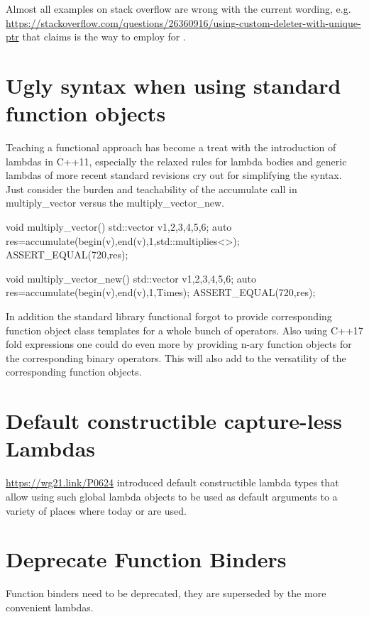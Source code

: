 \documentclass[ebook,11pt,article]{memoir}
\begin{document}
Almost all examples on stack overflow are wrong with the current wording, e.g. \url{https://stackoverflow.com/questions/26360916/using-custom-deleter-with-unique-ptr} that claims  is the way to employ  for . 

\section{Ugly syntax when using standard function objects}

Teaching a functional approach has become a treat with the introduction of lambdas in C++11, especially the relaxed rules for lambda bodies and generic lambdas of more recent standard revisions cry out for simplifying the syntax. Just consider the burden and teachability of the accumulate call in multiply_vector versus the multiply_vector_new.

\begin{codeblock}
void multiply_vector(){
	std::vector v{1,2,3,4,5,6};
	auto res=accumulate(begin(v),end(v),1,std::multiplies<>{});
	ASSERT_EQUAL(720,res);
}
\end{codeblock}
\begin{codeblock}
void multiply_vector_new(){
	std::vector v{1,2,3,4,5,6};
	auto res=accumulate(begin(v),end(v),1,Times);
	ASSERT_EQUAL(720,res);
}
\end{codeblock}

In addition the standard library functional forgot to provide corresponding function object class templates for a whole bunch of operators. Also using C++17 fold expressions one could do even more by providing n-ary function objects for the corresponding binary operators. This will also add to the versatility of the corresponding function objects.

\section{Default constructible capture-less Lambdas}
\url{https://wg21.link/P0624} introduced default constructible lambda types that allow using such global lambda objects to be used as default arguments to a variety of places where today  or  are used.

\section{Deprecate Function Binders}
Function binders need to be deprecated, they are superseded by the more convenient lambdas.
\end{document}
